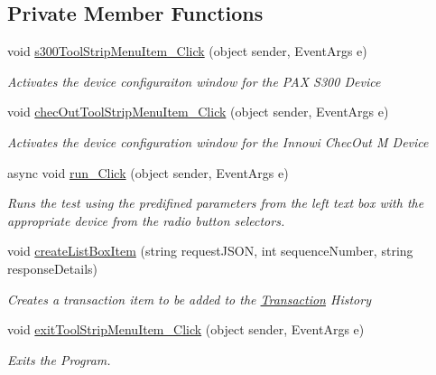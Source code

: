 \subsection*{Private Member Functions}
\begin{DoxyCompactItemize}
\item 
void \mbox{\hyperlink{class_cert_complete_1_1_cert_complete_a111983d372181505a83c4c05fd2927db}{s300\+Tool\+Strip\+Menu\+Item\+\_\+\+Click}} (object sender, Event\+Args e)
\begin{DoxyCompactList}\small\item\em Activates the device configuraiton window for the P\+AX S300 Device \end{DoxyCompactList}\item 
void \mbox{\hyperlink{class_cert_complete_1_1_cert_complete_af32ec63eabf58c1f8bab45e9a21ec01b}{chec\+Out\+Tool\+Strip\+Menu\+Item\+\_\+\+Click}} (object sender, Event\+Args e)
\begin{DoxyCompactList}\small\item\em Activates the device configuration window for the Innowi Chec\+Out M Device \end{DoxyCompactList}\item 
async void \mbox{\hyperlink{class_cert_complete_1_1_cert_complete_a60cf99433d4cf3dcf57bedc1e5556b9e}{run\+\_\+\+Click}} (object sender, Event\+Args e)
\begin{DoxyCompactList}\small\item\em Runs the test using the predifined parameters from the left text box with the appropriate device from the radio button selectors. \end{DoxyCompactList}\item 
void \mbox{\hyperlink{class_cert_complete_1_1_cert_complete_a4a2828f6d9a0651f6b0c1c41acced8c3}{create\+List\+Box\+Item}} (string request\+J\+S\+ON, int sequence\+Number, string response\+Details)
\begin{DoxyCompactList}\small\item\em Creates a transaction item to be added to the \mbox{\hyperlink{class_cert_complete_1_1_transaction}{Transaction}} History \end{DoxyCompactList}\item 
void \mbox{\hyperlink{class_cert_complete_1_1_cert_complete_a2eb0c31c2103df9e168a415ef8b5388f}{exit\+Tool\+Strip\+Menu\+Item\+\_\+\+Click}} (object sender, Event\+Args e)
\begin{DoxyCompactList}\small\item\em Exits the Program. \end{DoxyCompactList}\item 

\end{DoxyCompactItemize}
